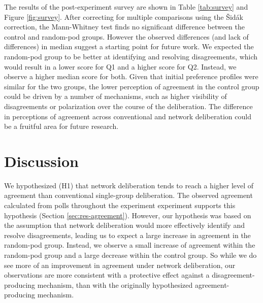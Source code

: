 {The results of the post-experiment survey are shown in Table \ref{tab:survey} and Figure \ref{fig:survey}.
After correcting for multiple comparisons using the Šidák correction, the Mann-Whitney test finds no significant difference between the control and random-pod groups.
However the observed differences (and lack of differences) in median suggest a starting point for future work.
We expected the random-pod group to be better at identifying and resolving disagreements, which would result in a lower score for Q1 and a higher score for Q2.
Instead, we observe a higher median score for both.
Given that initial preference profiles were similar for the two groups, the lower perception of agreement in the control group could be driven by a number of mechanisms, such as higher visibility of disagreements or polarization over the course of the deliberation.
The difference in perceptions of agreement across conventional and network deliberation could be a fruitful area for future research.

\section{Discussion}
\label{sec:discussion}

We hypothesized (H1) that network deliberation tends to reach a higher level of agreement than conventional single-group deliberation.
The observed agreement calculated from polls throughout the experiment experiment supports this hypothesis (Section \ref{sec:res-agreement}).
However, our hypothesis was based on the assumption that network deliberation would more effectively identify and resolve disagreements,
leading us to expect a large increase in agreement in the random-pod group.
Instead, we observe a small increase of agreement within the random-pod group and a large decrease within the control group.
So while we do see more of an improvement in agreement under network deliberation, our observations are more consistent with a protective effect against a disagreement-producing mechanism, than with the originally hypothesized agreement-producing mechanism.

}
